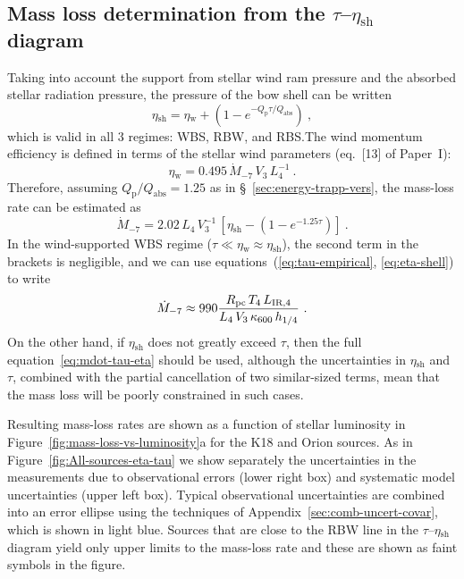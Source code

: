 \documentclass[useAMS, usenatbib, a4paper]{mnras}
\newcommand\Qp{\ensuremath{Q_{\text{p}}}}
\newcommand{\wind}{\ensuremath{_{\text{w}}}}
\newcommand\shell{\ensuremath{_{\text{sh}}}}
\begin{document}
\subsection{Mass loss determination from the \boldmath \(\tau\)--\(\eta\shell\) diagram}
\label{sec:mass-loss-determ}

Taking into account the support from stellar wind ram pressure and the
absorbed stellar radiation pressure, the pressure of the bow shell can
be written
\begin{equation}
  \label{eq:eta-shell-components}
  \eta\shell = \eta\wind +  \left(  1 - e^{-\Qp \tau / Q_{\text{abs}}}\right) \ ,
\end{equation}
which is valid in all 3 regimes: WBS, RBW, and RBS.\@ The wind
momentum efficiency is defined in terms of the stellar wind parameters
(eq.~[13] of Paper~I):
\begin{equation}
  \label{eq:wind-eta-typical}
  \eta\wind = \num{0.495} \,\dot{M}_{-7} \,V_3  \,L_4^{-1} \ .
\end{equation}
Therefore, assuming \(\Qp/Q_{\text{abs}} = 1.25\) as in
\S~\ref{sec:energy-trapp-vers}, the mass-loss rate can be estimated as
\begin{equation}
  \label{eq:mdot-tau-eta}
  \dot{M}_{-7} = 2.02 \, L_4 \, V_3^{-1} \,
  \left[ \eta\shell - \left(  1 - e^{-1.25 \tau} \right) \right]  \ .
\end{equation}
In the wind-supported WBS regime
(\(\tau \ll \eta\wind \approx \eta\shell\)), the second term in the brackets is
negligible, and we can use equations~(\ref{eq:tau-empirical},
\ref{eq:eta-shell}) to write
\begin{equation}
  \label{eq:mdot-eta-wbs}
  \dot{M}_{-7} \approx 990 \frac{R_{\text{pc}} \, T_4 \, L_{\text{IR},4}}{L_4 \, V_3 \, \kappa_{600} \, h_{1/4}} \ .
\end{equation}
On the other hand, if \(\eta\shell\) does not greatly exceed \(\tau\), then
the full equation~\eqref{eq:mdot-tau-eta} should be used, although the
uncertainties in \(\eta\shell\) and \(\tau\), combined with the partial
cancellation of two similar-sized terms, mean that the mass loss will
be poorly constrained in such cases.

Resulting mass-loss rates are shown as a function of stellar
luminosity in Figure~\ref{fig:mass-loss-vs-luminosity}a for the K18
and Orion sources.  As in Figure~\ref{fig:All-sources-eta-tau} we show
separately the uncertainties in the measurements due to observational
errors (lower right box) and systematic model uncertainties (upper
left box).  Typical observational uncertainties are combined into an
error ellipse using the techniques of
Appendix~\ref{sec:comb-uncert-covar}, which is shown in light blue.
Sources that are close to the RBW line in the \(\tau\)--\(\eta\shell\)
diagram yield only upper limits to the mass-loss rate and these are
shown as faint symbols in the figure.
\end{document}
